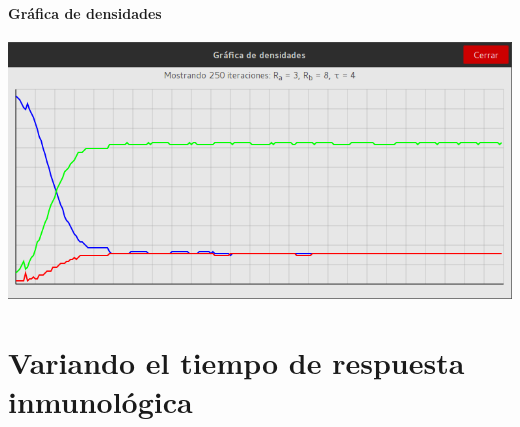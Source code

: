 \documentclass[12pt,letterpaper,oneside]{report}
\begin{document}
	\subsubsection{Gráfica de densidades}
	\begin{center}
		\includegraphics[width=14cm]{img/resistencia/max/g.png}
	\end{center}
	
	\chapter{Variando el tiempo de respuesta inmunológica}
\end{document}
